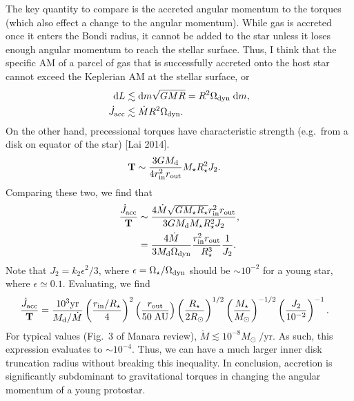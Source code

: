 \documentclass[12pt]{article}
\newcommand*{\bm}[1]{\boldsymbol{\mathbf{#1}}}
\newcommand*{\p}[1]{\left(#1\right)}
\begin{document}
The key quantity to compare is the accreted angular momentum to the torques
(which also effect a change to the angular momentum).
While gas is accreted once it enters the Bondi radius, it cannot be added to the
star unless it loses enough angular momentum to reach the stellar surface.
Thus, I think that the specific AM of a parcel of gas that is successfully
accreted onto the host star cannot exceed the Keplerian AM at the stellar
surface, or
\begin{align}
    \mathrm{d}L
        &\lesssim \mathrm{d}m \sqrt{GMR} = R^2 \Omega_{\rm dyn} \;\mathrm{d}m,\\
    \dot{J}_{\rm acc}
        &\lesssim \dot{M} R^2\Omega_{\rm dyn}.
\end{align}
On the other hand, precessional torques have characteristic strength (e.g.\ from
a disk on equator of the star) [Lai 2014].
\begin{align}
    \bm{T}
        &\sim \frac{3GM_{\rm d}}{4r_{\rm in}^2r_{\rm out}}M_\star R_\star^2J_2.
\end{align}
Comparing these two, we find that
\begin{align}
    \frac{\dot{J}_{\rm acc}}{\bm{T}}
        &\sim \frac{4\dot{M}\sqrt{GM_\star R_\star}r_{\rm in}^2r_{\rm out}}{
            3GM_{\rm d}M_\star R_\star^2 J_2},\\
        &=
            \frac{4\dot{M}}{3M_{\rm d}\Omega_{\rm dyn}}
            \frac{r_{\rm in}^2r_{\rm out}}{R_\star^3}
            \frac{1}{J_2}.
\end{align}
Note that $J_2 = k_2 \epsilon^2 / 3$, where $\epsilon = \Omega_\star /
\Omega_{\rm dyn}$ should be $\sim 10^{-2}$ for a young star, where $\epsilon
\simeq 0.1$. Evaluating, we find
\begin{align}
    \frac{\dot{J}_{\rm acc}}{\bm{T}}
        &= \frac{10^3\mathrm{yr}}{M_{\rm d} / \dot{M}}
            \p{\frac{r_{\rm in} / R_\star}{4}}^2
            \p{\frac{r_{\rm out}}{50\;\mathrm{AU}}}
            \p{\frac{R_\star}{2R_{\odot}}}^{1/2}
            \p{\frac{M_\star}{M_{\odot}}}^{-1/2}
            \p{\frac{J_2}{10^{-2}}}^{-1}.
\end{align}
For typical values (Fig.~3 of Manara review), $\dot{M} \lesssim
10^{-8}M_{\odot}\;\mathrm{/yr}$.
As such, this expression evaluates to $\sim 10^{-4}$.
Thus, we can have a much larger inner disk truncation radius without breaking
this inequality.
In conclusion, accretion is significantly subdominant to gravitational torques
in changing the angular momentum of a young protostar.
\end{document}

